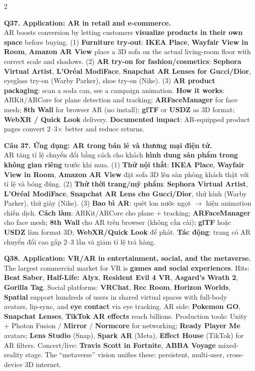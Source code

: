 \begin{paracol}{2}
\switchcolumn*

\textbf{Q37. Application: AR in retail and e-commerce.}\\
AR boosts conversion by letting customers \textbf{visualize products in their own space} before buying. (1) \textbf{Furniture try-out}: \textbf{IKEA Place}, \textbf{Wayfair View in Room}, \textbf{Amazon AR View} place a 3D sofa on the actual living-room floor with correct scale and shadows. (2) \textbf{AR try-on for fashion/cosmetics}: \textbf{Sephora Virtual Artist}, \textbf{L'Or{\'e}al ModiFace}, \textbf{Snapchat AR Lenses for Gucci/Dior}, eyeglass try-on (Warby Parker), shoe try-on (Nike). (3) \textbf{AR product packaging}: scan a soda can, see a campaign animation. \textbf{How it works}: ARKit/ARCore for plane detection and tracking; \textbf{ARFaceManager} for face mesh; \textbf{8th Wall} for browser AR (no install); \textbf{glTF} or \textbf{USDZ} as 3D format; \textbf{WebXR / Quick Look} delivery. \textbf{Documented impact}: AR-equipped product pages convert 2--3$\times$ better and reduce returns.

\switchcolumn

\textbf{Câu 37. Ứng dụng: AR trong bán lẻ và thương mại điện tử.}\\
AR tăng tỉ lệ chuyển đổi bằng cách cho khách \textbf{hình dung sản phẩm trong không gian riêng} trước khi mua. (1) \textbf{Thử nội thất}: \textbf{IKEA Place}, \textbf{Wayfair View in Room}, \textbf{Amazon AR View} đặt sofa 3D lên sàn phòng khách thật với tỉ lệ và bóng đúng. (2) \textbf{Thử thời trang/mỹ phẩm}: \textbf{Sephora Virtual Artist}, \textbf{L'Or{\'e}al ModiFace}, \textbf{Snapchat AR Lens cho Gucci/Dior}, thử kính (Warby Parker), thử giày (Nike). (3) \textbf{Bao bì AR}: quét lon nước ngọt $\to$ hiện animation chiến dịch. \textbf{Cách làm}: ARKit/ARCore cho plane + tracking; \textbf{ARFaceManager} cho face mesh; \textbf{8th Wall} cho AR trên browser (không cần cài); \textbf{glTF} hoặc \textbf{USDZ} làm format 3D; \textbf{WebXR/Quick Look} để phát. \textbf{Tác động}: trang có AR chuyển đổi cao gấp 2--3 lần và giảm tỉ lệ trả hàng.

\switchcolumn*

\textbf{Q38. Application: VR/AR in entertainment, social, and the metaverse.}\\
The largest commercial market for VR is \textbf{games and social experiences}. Hits: \textbf{Beat Saber}, \textbf{Half-Life: Alyx}, \textbf{Resident Evil 4 VR}, \textbf{Asgard's Wrath 2}, \textbf{Gorilla Tag}. Social platforms: \textbf{VRChat}, \textbf{Rec Room}, \textbf{Horizon Worlds}, \textbf{Spatial} support hundreds of users in shared virtual spaces with full-body avatars, lip-sync, and \textbf{eye contact} via eye tracking. AR side: \textbf{Pokemon GO}, \textbf{Snapchat Lenses}, \textbf{TikTok AR effects} reach billions. Production tools: Unity + Photon Fusion / \textbf{Mirror} / \textbf{Normcore} for networking; \textbf{Ready Player Me} avatars; \textbf{Lens Studio} (Snap), \textbf{Spark AR} (Meta), \textbf{Effect House} (TikTok) for AR filters. Concert/live: \textbf{Travis Scott in Fortnite}, \textbf{ABBA Voyage} mixed-reality stage. The ``metaverse'' vision unifies these: persistent, multi-user, cross-device 3D internet.


\end{paracol}
